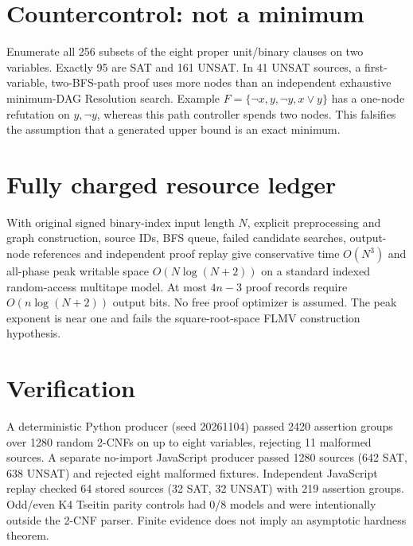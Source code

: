 \documentclass{article}
\begin{document}
\section*{Countercontrol: not a minimum}
Enumerate all 256 subsets of the eight proper unit/binary clauses on two variables. Exactly 95 are SAT and 161 UNSAT. In 41 UNSAT sources, a first-variable, two-BFS-path proof uses more nodes than an independent exhaustive minimum-DAG Resolution search. Example $F=\{\neg x,y,\neg y,x\lor y\}$ has a one-node refutation on $y,\neg y$, whereas this path controller spends two nodes. This falsifies the assumption that a generated upper bound is an exact minimum.
\section*{Fully charged resource ledger}
With original signed binary-index input length $N$, explicit preprocessing and graph construction, source IDs, BFS queue, failed candidate searches, output-node references and independent proof replay give conservative time $O(N^3)$ and all-phase peak writable space $O(N\log(N+2))$ on a standard indexed random-access multitape model. At most $4n-3$ proof records require $O(n\log(N+2))$ output bits. No free proof optimizer is assumed. The peak exponent is near one and fails the square-root-space FLMV construction hypothesis.
\section*{Verification}
A deterministic Python producer (seed 20261104) passed 2420 assertion groups over 1280 random 2-CNFs on up to eight variables, rejecting 11 malformed sources. A separate no-import JavaScript producer passed 1280 sources (642 SAT, 638 UNSAT) and rejected eight malformed fixtures. Independent JavaScript replay checked 64 stored sources (32 SAT, 32 UNSAT) with 219 assertion groups. Odd/even K4 Tseitin parity controls had 0/8 models and were intentionally outside the 2-CNF parser. Finite evidence does not imply an asymptotic hardness theorem.
\end{document}
